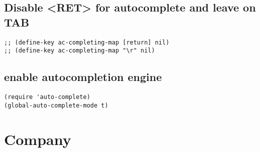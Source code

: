 \documentclass[11pt]{article}
\begin{document}
\subsection*{Disable <RET> for autocomplete and leave on TAB}
\label{sec:org96ed232}
\begin{verbatim}
;; (define-key ac-completing-map [return] nil)
;; (define-key ac-completing-map "\r" nil)
\end{verbatim}


\subsection*{enable autocompletion engine}
\label{sec:orgec7aff9}
\begin{verbatim}
(require 'auto-complete)
(global-auto-complete-mode t)
\end{verbatim}


\section*{Company}
\label{sec:org39621fd}
\end{document}
